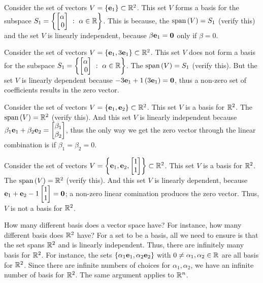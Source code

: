 \begin{boxedstuff}
    \begin{example}
        Consider the set of vectors $V = \left\{ \mathbf{e}_1 \right\} \subset \mathbb{R}^2$. This set $V$ forms a basis for the subspace $S_1 = \lc \bmx \alpha \\ 0\emx \,\, : \,\, \alpha \in \mb{R} \rc$. This is because, the $\text{span}\left( V\right) = S_1$ (verify this) and the set $V$ is linearly independent, because $\beta \mathbf{e}_1 = \mathbf{0}$ only if $\beta = 0$.
    \end{example}

    \begin{example}
        Consider the set of vectors $V = \left\{ \mathbf{e}_1, 3\mathbf{e}_1\right\} \subset \mathbb{R}^2$. This set $V$ does not form a basis for the subspace $S_1 = \lc \bmx \alpha \\ 0\emx \,\, : \,\, \alpha \in \mb{R} \rc$. The $\text{span}\left( V\right) = S_1$ (verify this). But the set $V$ is linearly dependent because $-3 \mathbf{e}_1 + 1\left( 3\mathbf{e}_1\right) = \mathbf{0}$, thus a non-zero set of coefficients results in the zero vector.
    \end{example}

    \begin{example}
        Consider the set of vectors $V = \left\{ \mathbf{e}_1, \mathbf{e}_2\right\} \subset \mathbb{R}^2$. This set $V$ is a basis for $\mathbb{R}^2$. The $\text{span}\left( V\right) = \mathbb{R}^2$ (verify this). And this set $V$ is linearly independent because $\beta_1 \mf{e}_1 + \beta_2\mf{e}_2 = \bmxc \beta_1 \\ \beta_2 \emx$, thus the only way we get the zero vector through the linear combination is if $\beta_1 = \beta_2 = 0$.
    \end{example}

    \begin{example}
        Consider the set of vectors $V = \lc \mf{e}_1, \mf{e}_2, \bmxc 1 \\ 1\emx\rc \subset \mb{R}^2$. This set $V$ is a basis for $\mathbb{R}^2$. The $\text{span}\left( V\right) = \mathbb{R}^2$ (verify this). And this set $V$ is linearly dependent, because $\mf{e}_1 + \mf{e}_2 - 1 \bmx 1 \\ 1\emx = \mf{0}$; a non-zero linear comination produces the zero vector. Thus, $V$ is not a basis for $\mathbb{R}^2$. 
    \end{example}
\end{boxedstuff}

How many different basis does a vector space have? For instance, how many different basis does $\mathbb{R}^2$ have? For a set to be a basis, all we need to ensure is that the set spans $\mathbb{R}^2$ and is linearly independent. Thus, there are infinitely many basis for $\mathbb{R}^2$. For instance, the sets $\left\{ \alpha_1\mathbf{e}_1, \alpha_2\mathbf{e}_2 \right\}$ with $0 \neq \alpha_1, \alpha_2 \in \mathbb{R}$ are all basis for $\mathbb{R}^2$. Since there are infinite numbers of choices for $\alpha_1, \alpha_2$, we have an infinite number of basis for $\mathbb{R}^2$. The same argument applies to $\mathbb{R}^n$.

